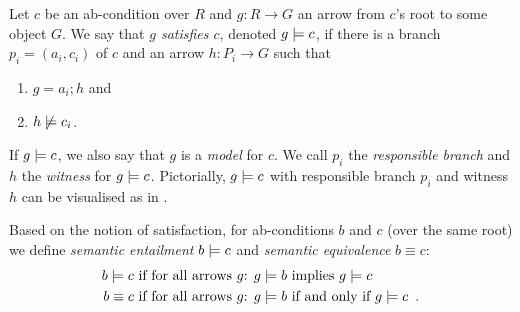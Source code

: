 \begin{definition}
  Let $c$ be an ab-condition over $R$ and $g:R\to G$ an arrow from $c$'s root to some object $G$. We say that \emph{$g$ satisfies $c$}, denoted $g\models c$, if there is a branch $p_i=(a_i,c_i)$ of $c$ and an arrow $h:P_i\to G$ such that
  \begin{enumerate}
  \item $g=a_i;h$ and
  \item $h\not\models c_i$.
  \end{enumerate}
\end{definition}
%
If $g\models c$, we also say that $g$ is a \emph{model} for $c$. We call $p_i$ the \emph{responsible branch} and $h$ the \emph{witness} for $g\models c$. Pictorially, $g\models c$ with responsible branch $p_i$ and witness $h$ can be visualised as in .

Based on the notion of satisfaction, for ab-conditions $b$ and $c$ (over the same root) we  define \emph{semantic entailment} $b\models c$ and \emph{semantic equivalence} $b\equiv c$:
%
\begin{align*}
b \models c & \text{ if for all arrows $g$: } g\models b \text{ implies } g\models c \\
b \equiv c & \text{ if for all arrows $g$: } g\models b \text{ if and only if } g\models c \enspace. 
\end{align*}


